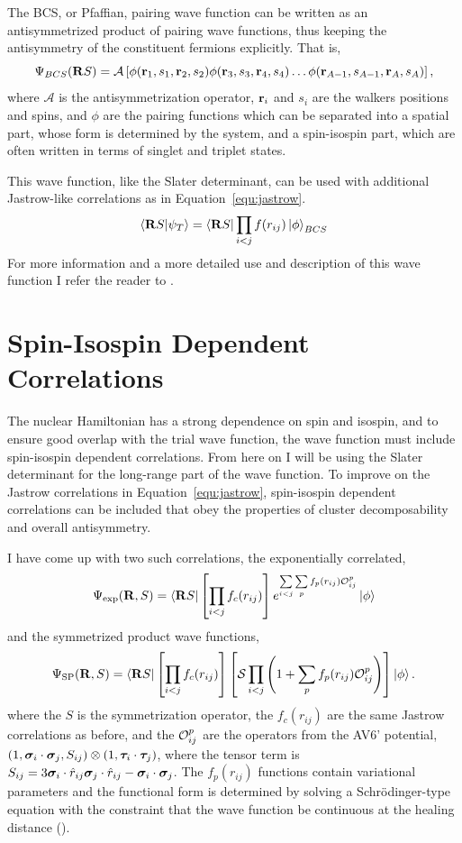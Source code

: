 The BCS, or Pfaffian, pairing wave function can be written as an antisymmetrized product of pairing wave functions, thus keeping the antisymmetry of the constituent fermions explicitly. That is,
\begin{equation}
   \Psi_{BCS}(\mathbf{R} S) = \mathcal{A}\left[\phi(\mathbf{r}_1,s_1,\mathbf{r}_2,s_2)\phi(\mathbf{r}_3,s_3,\mathbf{r}_4,s_4)\ldots\phi(\mathbf{r}_{A-1},s_{A-1},\mathbf{r}_A,s_A)\right],
\end{equation}
where $\mathcal{A}$ is the antisymmetrization operator, $\mathbf{r}_i$ and $s_i$ are the walkers positions and spins, and $\phi$ are the pairing functions which can be separated into a spatial part, whose form is determined by the system, and a spin-isospin part, which are often written in terms of singlet and triplet states.

This wave function, like the Slater determinant, can be used with additional Jastrow-like correlations as in Equation~\ref{equ:jastrow}.
\begin{equation}
   \left< \mathbf{R} S | \psi_T \right> = \left< \mathbf{R} S \right|\prod\limits_{i<j}f(r_{ij}) \left| \phi \right>_{BCS}
\end{equation}
For more information and a more detailed use and description of this wave function I refer the reader to \cite{madeira2018_diss}.

\section{Spin-Isospin Dependent Correlations}
The nuclear Hamiltonian has a strong dependence on spin and isospin, and to ensure good overlap with the trial wave function, the wave function must include spin-isospin dependent correlations. From here on I will be using the Slater determinant for the long-range part of the wave function. To improve on the Jastrow correlations in Equation~\ref{equ:jastrow}, spin-isospin dependent correlations can be included that obey the properties of cluster decomposability and overall antisymmetry.

I have come up with two such correlations, the exponentially correlated,
\begin{equation}
   \Psi_{\text{exp}}(\mathbf{R}, S) = \left< \mathbf{R} S \right|\left[\prod\limits_{i<j}f_c(r_{ij})\right] e^{\sum\limits_{i<j}\sum\limits_{p}f_p(r_{ij})\mathcal{O}_{ij}^p}\left| \phi \right>
   \label{equ:exppsi}
\end{equation}
and the symmetrized product wave functions,
\begin{equation}
   \Psi_{\text{SP}}(\mathbf{R}, S) = \left< \mathbf{R} S \right|\left[\prod\limits_{i<j}f_c(r_{ij})\right] \left[\mathcal{S}\prod\limits_{i<j}\left(1+\sum\limits_pf_p(r_{ij})\mathcal{O}_{ij}^p\right)\right] \left| \phi \right>.
   \label{equ:prodpsi}
\end{equation}
where the $S$ is the symmetrization operator, the $f_c(r_{ij})$ are the same Jastrow correlations as before, and the $\mathcal{O}_{ij}^p$ are the operators from the AV6' potential, $(1,\bm{\sigma}_i\cdot\bm{\sigma}_j,S_{ij})\otimes(1,\bm{\tau}_i\cdot\bm{\tau}_j)$, where the tensor term is $S_{ij} = 3\bm{\sigma}_i\cdot\hat{r}_{ij}\bm{\sigma}_j\cdot\hat{r}_{ij}-\bm{\sigma}_i\cdot\bm{\sigma}_j$. The $f_p(r_{ij})$ functions contain variational parameters and the functional form is determined by solving a Schr\"odinger-type equation with the constraint that the wave function be continuous at the healing distance (\cite{pandharipande1979,pandharipande1977}).

